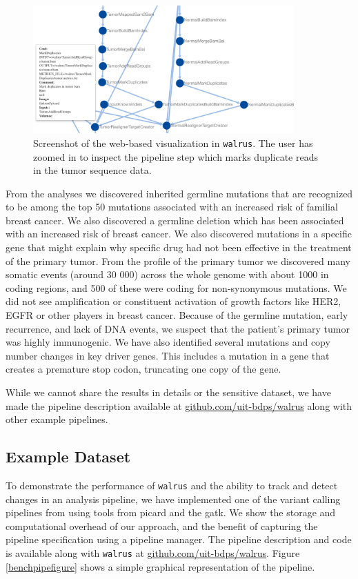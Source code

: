 \begin{figure}
    \centering
\includegraphics[width=10cm]{figures/webshot.png}
    \caption[Screenshot of the web-based visualization in
    \texttt{walrus}]{Screenshot of the web-based visualization in
    \texttt{walrus}. The user has zoomed in to inspect the pipeline step which
    marks duplicate reads in the tumor sequence data.}
    \label{webshotfig}
\end{figure} 

From the analyses we discovered inherited germline mutations that are recognized
to be among the top 50 mutations associated with an increased risk of familial
breast cancer. We also discovered a germline deletion which has been associated
with an increased risk of breast cancer. We also discovered mutations in a
specific gene that might explain why specific drug had not been effective in the
treatment of the primary tumor. From the profile of the primary tumor we
discovered many somatic events (around 30 000) across the whole genome with
about 1000 in coding regions, and 500 of these were coding for non-synonymous
mutations.  We did not see amplification or constituent activation of growth
factors like HER2, EGFR or other players in breast cancer. Because of the
germline mutation, early recurrence, and lack of DNA events, we suspect that the
patient's primary tumor was highly immunogenic. We have also identified several
mutations and copy number changes in key driver genes. This includes a mutation
in a gene that creates a premature stop codon, truncating one copy of the gene.

While we cannot share the results in details or the sensitive dataset, we have
made the pipeline description available at \url{github.com/uit-bdps/walrus}
along with other example pipelines. 

\subsection{Example Dataset}
To demonstrate the performance of \texttt{walrus} and the ability to track and
detect changes in an analysis pipeline, we have implemented one of the variant
calling pipelines from \cite{cornish2015comparison} using tools from picard and
the \gls{gatk}. We show the storage and computational overhead of our approach,
and the benefit of capturing the pipeline specification using a pipeline
manager.  The pipeline description and code is available along with
\texttt{walrus} at \url{github.com/uit-bdps/walrus}. Figure
\ref{benchpipefigure} shows a simple graphical representation of the pipeline. 

